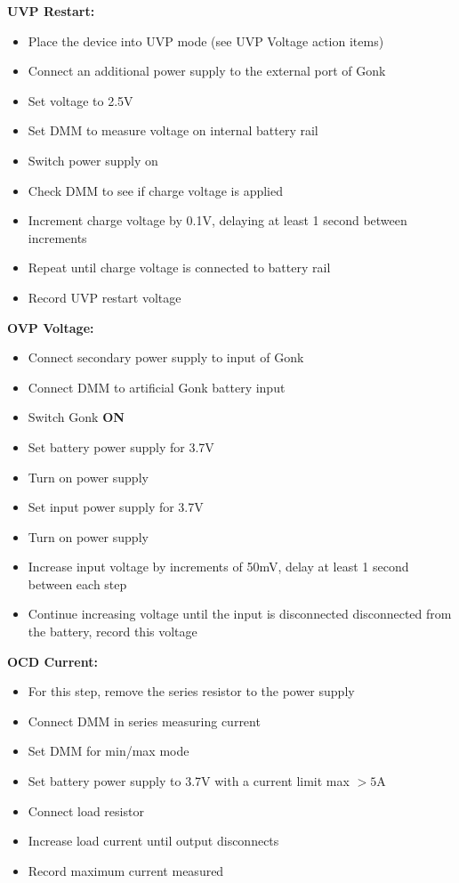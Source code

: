 {\Large \textbf{UVP Restart:}}
\begin{itemize}
\item Place the device into UVP mode (see UVP Voltage action items)
\item Connect an additional power supply to the external port of Gonk
\item Set voltage to 2.5V
\item Set DMM to measure voltage on internal battery rail 
\item Switch power supply on
\item Check DMM to see if charge voltage is applied 
\item Increment charge voltage by 0.1V, delaying at least 1 second between increments
\item Repeat until charge voltage is connected to battery rail
\item Record UVP restart voltage 
\end{itemize}

{\Large \textbf{OVP Voltage:}}
\begin{itemize}
\item Connect secondary power supply to input of Gonk
\item Connect DMM to artificial Gonk battery input
\item Switch Gonk \textbf{ON} 
\item Set battery power supply for 3.7V
\item Turn on power supply
\item Set input power supply for 3.7V
\item Turn on power supply
\item Increase input voltage by increments of 50mV, delay at least 1 second between each step
\item Continue increasing voltage until the input is disconnected disconnected from the battery, record this voltage 
\end{itemize}

{\Large \textbf{OCD Current:}}
\begin{itemize}
\item For this step, remove the series resistor to the power supply
\item Connect DMM in series measuring current
\item Set DMM for min/max mode
\item Set battery power supply to 3.7V with a current limit max $>5 \text{A}$
\item Connect load resistor
\item Increase load current until output disconnects
\item Record maximum current measured 
\end{itemize}

